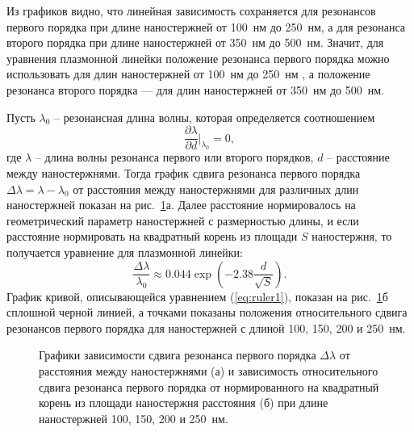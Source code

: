 Из графиков видно, что линейная зависимость сохраняется для резонансов первого порядка при длине наностержней от 100~нм до 250~нм, а для резонанса второго порядка при длине наностержней от 350~нм до 500~нм. Значит, для уравнения плазмонной линейки положение резонанса первого порядка можно использовать для длин наностержней от 100~нм до 250~нм  , а положение резонанса второго порядка --- для длин наностержней от 350~нм до 500~нм.

Пусть $ \lambda_0 $ -- резонансная длина волны, которая определяется соотношением
\begin{equation}
\dfrac{\partial \lambda}{\partial d} \Big|_{\lambda _0} = 0,
\end{equation}
где $ \lambda $ -- длина волны резонанса первого или второго порядков, $ d $ -- расстояние между наностержнями. Тогда график сдвига резонанса первого порядка $ \Delta \lambda =  \lambda - \lambda_0 $ от расстояния между наностержнями для различных длин наностержней показан на рис.~\ref{img:ruler1}а. Далее расстояние нормировалось на геометрический параметр наностержней с размерностью длины, и если расстояние нормировать на квадратный корень из площади $ S $ наностержня, то получается уравнение для плазмонной линейки:
\begin{equation}
\frac{\Delta \lambda}{\lambda_0} \approx 0.044 \exp \left( - 2.38 \frac{d}{\sqrt{S}} \right).
\label{eq:ruler1}
\end{equation}
График кривой, описывающейся уравнением (\ref{eq:ruler1}), показан на рис.~\ref{img:ruler1}б сплошной черной линией, а точками показаны положения относительного сдвига резонансов первого порядка для наностержней с длиной 100, 150, 200 и 250~нм.

\begin{figure}
\caption{Графики зависимости сдвига резонанса первого порядка $ \Delta \lambda $ от расстояния между наностержнями (а) и зависимость относительного сдвига резонанса первого порядка от нормированного на квадратный корень из площади наностержня расстояния (б) при длине наностержней 100, 150, 200 и 250~нм. }
\label{img:ruler1}
\end{figure}

